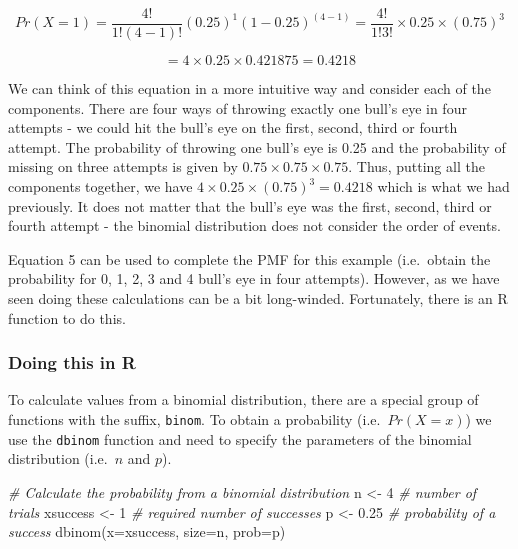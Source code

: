 \documentclass[
  oneside]{krantz}
\newenvironment{Shaded}{\begin{snugshade}}{\end{snugshade}}
\newcommand{\AttributeTok}[1]{\textcolor[rgb]{0.77,0.63,0.00}{#1}}
\newcommand{\CommentTok}[1]{\textcolor[rgb]{0.56,0.35,0.01}{\textit{#1}}}
\newcommand{\DecValTok}[1]{\textcolor[rgb]{0.00,0.00,0.81}{#1}}
\newcommand{\FloatTok}[1]{\textcolor[rgb]{0.00,0.00,0.81}{#1}}
\newcommand{\FunctionTok}[1]{\textcolor[rgb]{0.00,0.00,0.00}{#1}}
\newcommand{\NormalTok}[1]{#1}
\newcommand{\OtherTok}[1]{\textcolor[rgb]{0.56,0.35,0.01}{#1}}
\begin{document}
\[Pr(X=1) = \frac{4!}{1!(4-1)!}(0.25)^1 (1-0.25)^{(4-1)} = \frac{4!}{1!3!} \times 0.25 \times (0.75)^3\]

\[ = 4 \times 0.25 \times 0.421875 = 0.4218\]

We can think of this equation in a more intuitive way and consider each of the components. There are four ways of throwing exactly one bull's eye in four attempts - we could hit the bull's eye on the first, second, third or fourth attempt. The probability of throwing one bull's eye is 0.25 and the probability of missing on three attempts is given by \(0.75 \times 0.75 \times 0.75\). Thus, putting all the components together, we have \(4 \times 0.25 \times (0.75)^3 = 0.4218\) which is what we had previously. It does not matter that the bull's eye was the first, second, third or fourth attempt - the binomial distribution does not consider the order of events.

Equation 5 can be used to complete the PMF for this example (i.e.~obtain the probability for 0, 1, 2, 3 and 4 bull's eye in four attempts). However, as we have seen doing these calculations can be a bit long-winded. Fortunately, there is an R function to do this.

\hypertarget{binomR}{%
\subsubsection{Doing this in R}\label{binomR}}

To calculate values from a binomial distribution, there are a special group of functions with the suffix, \texttt{binom}. To obtain a probability (i.e.~\(Pr(X=x)\)) we use the \texttt{dbinom} function and need to specify the parameters of the binomial distribution (i.e.~\(n\) and \(p\)).

\begin{Shaded}
\begin{Highlighting}[]
\CommentTok{\# Calculate the probability from a binomial distribution}
\NormalTok{n }\OtherTok{\textless{}{-}} \DecValTok{4} \CommentTok{\# number of trials}
\NormalTok{xsuccess }\OtherTok{\textless{}{-}} \DecValTok{1} \CommentTok{\# required number of successes}
\NormalTok{p }\OtherTok{\textless{}{-}} \FloatTok{0.25} \CommentTok{\# probability of a success}
\FunctionTok{dbinom}\NormalTok{(}\AttributeTok{x=}\NormalTok{xsuccess, }\AttributeTok{size=}\NormalTok{n, }\AttributeTok{prob=}\NormalTok{p)}
\end{Highlighting}
\end{Shaded}
\end{document}

